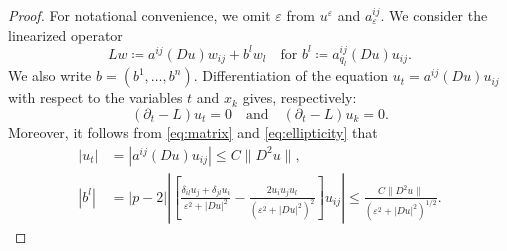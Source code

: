 \documentclass[10pt,a4paper]{amsart}
\begin{document}
\begin{proof}
For notational convenience, we omit $\varepsilon$ from $u^\varepsilon$ and $a_\varepsilon^{ij}$. We consider the linearized operator
\begin{equation*}
 Lw\coloneqq a^{ij}(Du)w_{ij}+b^l w_l \quad \text{for $b^l\coloneqq a^{ij}_{q_l}(Du)u_{ij}$}.
\end{equation*}
We also write $b=(b^1, \ldots, b^n)$. Differentiation of the equation $u_t=a^{ij}(Du)u_{ij}$ with respect to the variables $t$ and $x_k$ gives, respectively:
\begin{equation}\label{eq:linearized}
 (\partial_t-L)u_t=0
 \quad \text{and} \quad
 (\partial_t-L)u_k=0.
\end{equation}
Moreover, it follows from \eqref{eq:matrix} and \eqref{eq:ellipticity} that
\begin{equation}\label{eq:drift}
    \begin{aligned}
    |u_t|&=|a^{ij}(Du)u_{ij}|\leq C\|D^2u\|,\\
    |b^l|&=|p-2|\left|\left[\frac{\delta_{il}u_j+\delta_{jl}u_i}{\varepsilon^2+|Du|^2}-\frac{2u_iu_ju_l}{(\varepsilon^2+|Du|^2)^2}\right] u_{ij} \right|\leq\frac{C\|D^2u\|}{(\varepsilon^2+|Du|^2)^{1/2}}.
    \end{aligned}
\end{equation}


\end{proof}
\end{document}
